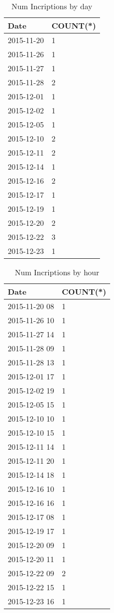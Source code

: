 \documentclass{article}
\begin{document}
\begin{table}[]
\centering
\caption{Num Incriptions by day}
\label{lblNum Incriptions by day}
\begin{tabular}{|ll|}
\textbf{Date} &\textbf{COUNT(*)} \\
\hline 
2015-11-20 & 1 \\
2015-11-26 & 1 \\
2015-11-27 & 1 \\
2015-11-28 & 2 \\
2015-12-01 & 1 \\
2015-12-02 & 1 \\
2015-12-05 & 1 \\
2015-12-10 & 2 \\
2015-12-11 & 2 \\
2015-12-14 & 1 \\
2015-12-16 & 2 \\
2015-12-17 & 1 \\
2015-12-19 & 1 \\
2015-12-20 & 2 \\
2015-12-22 & 3 \\
2015-12-23 & 1 \\
\end{tabular}
\end{table}

\begin{table}[]
\centering
\caption{Num Incriptions by hour}
\label{lblNum Incriptions by hour}
\begin{tabular}{|ll|}
\textbf{Date} &\textbf{COUNT(*)} \\
\hline 
2015-11-20 08 & 1 \\
2015-11-26 10 & 1 \\
2015-11-27 14 & 1 \\
2015-11-28 09 & 1 \\
2015-11-28 13 & 1 \\
2015-12-01 17 & 1 \\
2015-12-02 19 & 1 \\
2015-12-05 15 & 1 \\
2015-12-10 10 & 1 \\
2015-12-10 15 & 1 \\
2015-12-11 14 & 1 \\
2015-12-11 20 & 1 \\
2015-12-14 18 & 1 \\
2015-12-16 10 & 1 \\
2015-12-16 16 & 1 \\
2015-12-17 08 & 1 \\
2015-12-19 17 & 1 \\
2015-12-20 09 & 1 \\
2015-12-20 11 & 1 \\
2015-12-22 09 & 2 \\
2015-12-22 15 & 1 \\
2015-12-23 16 & 1 \\
\end{tabular}
\end{table}
\end{document}
